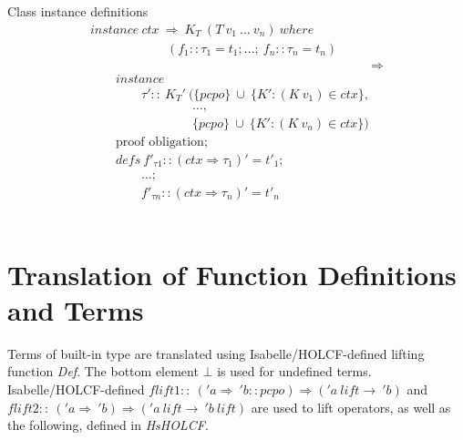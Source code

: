 \documentclass{llncs}
\begin{document}
\noindent Class instance definitions
$$\begin{array}{l}
instance \ ctx \ \Rightarrow \ K_T \ (T \ v_1 \ \ldots \ v_n) \ where \\ 
  \qquad \qquad \qquad (f_1::\tau_1 = t_1; \ldots; \ f_n::\tau_n = t_n) \\
  \qquad \qquad \qquad \qquad \qquad \qquad \qquad 
  \qquad \qquad \qquad \qquad \Longrightarrow \\
  \qquad instance \\
  \qquad \qquad \tau' :: \ K_{T}' \ (\{pcpo\} \ \cup \ \{K':(K \ v_1)
  \in ctx\}, \\
   \qquad \qquad \qquad \quad \quad  \ldots, \\
  \qquad \qquad \qquad \quad \quad 
         \{pcpo\} \ \cup \ \{K':(K \ v_n) \in ctx\}) \\
  \qquad \mbox{proof \ obligation}; \\
  \qquad defs \ f'_{\tau 1} :: (ctx \Rightarrow \tau_1)' = t'_1; \\
  \qquad \qquad \ldots; \\
  \qquad \qquad f'_{\tau n} :: (ctx \Rightarrow \tau_n)' = t'_n
\end{array}$$\\





\section{Translation of Function Definitions and Terms}

Terms of built-in type are translated using Isabelle/HOLCF-defined lifting function
\emph{Def}.  The bottom element $\bot$ is used for undefined terms.
Isabelle/HOLCF-defined $flift1 :: \ ('a \Rightarrow \ 'b::pcpo) \Rightarrow ('a
\ lift \to \ 'b)$ and $flift2 :: \ ('a \Rightarrow \ 'b) \Rightarrow ('a \ lift
\to \ 'b \ 
lift)$ are used to lift operators, as well as the following, defined in
\emph{HsHOLCF}.\\
\end{document}

